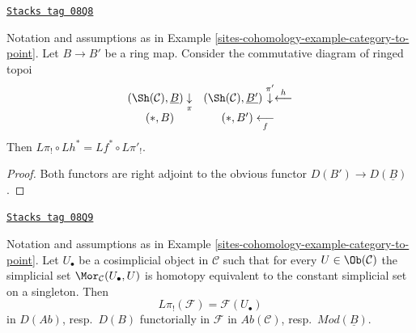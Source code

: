\begin{lemma}
\label{sites-cohomology-lemma-change-of-rings}
\href{https://stacks.math.columbia.edu/tag/08Q8}{\texttt{Stacks tag 08Q8}}

Notation and assumptions as in Example \ref{sites-cohomology-example-category-to-point}.
Let $B \to B'$ be a ring map. Consider the commutative diagram
of ringed topoi
$$
\begin{array}{cc}(\Sh(\mathcal{C}), \underline{B}) \underset{\pi}{\downarrow} & (\Sh(\mathcal{C}), \underline{B'}) \overset{\pi'}{\downarrow}\overset{h}{\longleftarrow} \\ (*, B) & (*, B') \underset{f}{\longleftarrow}\end{array}
$$
Then $L\pi_! \circ Lh^* = Lf^* \circ L\pi'_!$.
\end{lemma}

\begin{proof}
Both functors are right adjoint to the obvious functor
$D(B') \to D(\underline{B})$.
\end{proof}

\begin{lemma}
\label{sites-cohomology-lemma-compute-by-cosimplicial-resolution}
\href{https://stacks.math.columbia.edu/tag/08Q9}{\texttt{Stacks tag 08Q9}}

Notation and assumptions as in Example \ref{sites-cohomology-example-category-to-point}.
Let $U_\bullet$ be a cosimplicial object in $\mathcal{C}$ such that
for every $U \in \Ob(\mathcal{C})$ the simplicial set
$\Mor_\mathcal{C}(U_\bullet, U)$
is homotopy equivalent to the constant simplicial set on a singleton. Then
$$
L\pi_!(\mathcal{F}) = \mathcal{F}(U_\bullet)
$$
in $D(\textit{Ab})$, resp.\ $D(B)$ functorially in $\mathcal{F}$ in
$\textit{Ab}(\mathcal{C})$, resp.\ $\textit{Mod}(\underline{B})$.
\end{lemma}

